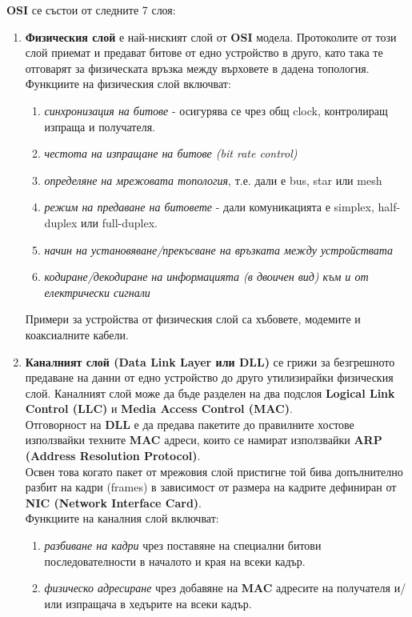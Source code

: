 \documentclass[fleqn,12pt]{article}
\begin{document}
\begin{flushleft}
\textbf{OSI} се състои от следните 7 слоя:
\begin{enumerate}
    \item \textbf{Физическия слой} е най-ниският слой от \textbf{OSI} модела. Протоколите от този слой приемат и предават битове от едно устройство в друго, като така те отговарят за
    физическата връзка между върховете в дадена топология. Функциите на физическия слой включват:
    \begin{enumerate}
        \item \textit{синхронизация на битове} - осигурява се чрез общ clock, контролиращ изпраща и получателя.
        \item \textit{честота на изпращане на битове (bit rate control)}
        \item \textit{определяне на мрежовата топология}, т.е. дали е bus, star или mesh
        \item \textit{режим на предаване на битовете} - дали комуникацията е simplex, half-duplex или full-duplex.
        \item \textit{начин на установяване/прекъсване на връзката между устройствата}
        \item \textit{кодиране/декодиране на информацията (в двоичен вид) към и от електрически сигнали}
    \end{enumerate}
    Примери за устройства от физическия слой са хъбовете, модемите и коаксиалните кабели.
    \item \textbf{Каналният слой (Data Link Layer или DLL)} се грижи за безгрешното предаване на данни от едно устройство до друго утилизирайки физическия слой.
    Каналният слой може да бъде разделен на два подслоя \textbf{Logical Link Control (LLC)} и \textbf{Media Access Control (MAC)}.\\
    Отговорност на \textbf{DLL} е да предава пакетите до правилните хостове използвайки техните \textbf{MAC} адреси, които се намират използвайки \textbf{ARP (Address Resolution Protocol)}.\\
    Освен това когато пакет от мрежовия слой пристигне той бива допълнително разбит на кадри (frames) в зависимост от размера на кадрите дефиниран от \textbf{NIC (Network Interface Card)}.\\
    Функциите на каналния слой включват:
    \begin{enumerate}
        \item \textit{разбиване на кадри} чрез поставяне на специални битови последователности в началото и края на всеки кадър.
        \item \textit{физическо адресиране} чрез добавяне на \textbf{MAC} адресите на получателя и/или изпращача в хедърите на всеки кадър.

\end{enumerate}
\end{enumerate}
\end{flushleft}
\end{document}
